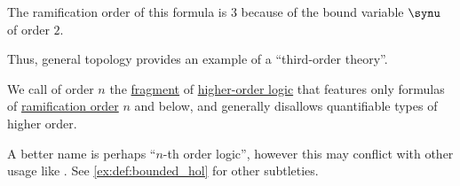 \begin{example}
\begin{thmenum}
    The ramification order of this formula is \( 3 \) because of the bound variable \( \synu \) of order \( 2 \).

    Thus, general topology provides an example of a \enquote{third-order theory}.
  \end{thmenum}
\end{example}

\begin{definition}\label{def:bounded_hol}\mimprovised
  We call  of order \( n \) the \hyperref[con:syntax_fragment]{fragment} of \hyperref[def:higher_order_logic]{higher-order logic} that features only formulas of \hyperref[def:hol_formula_ramification_order]{ramification order} \( n \) and below, and generally disallows quantifiable types of higher order.
\end{definition}
\begin{comments}
  \item A better name is perhaps \enquote{\( n \)-th order logic}, however this may conflict with other usage like . See \cref{ex:def:bounded_hol} for other subtleties.
\end{comments}

